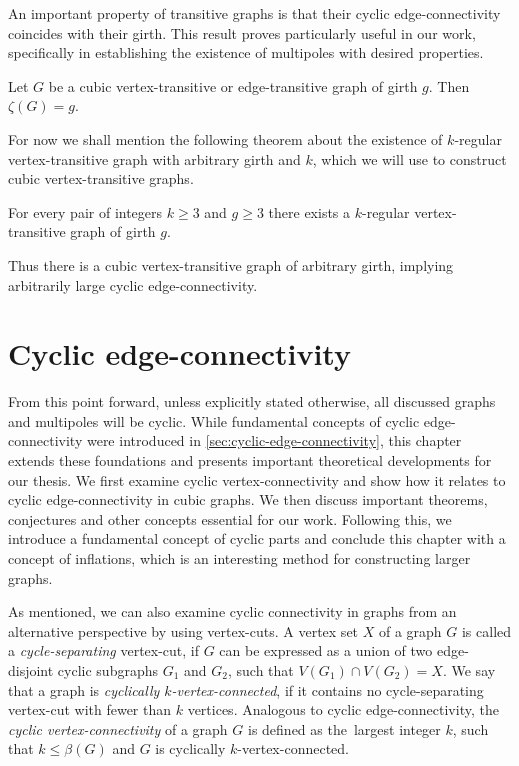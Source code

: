 \documentclass[12pt, twoside]{book}
\begin{document}
An important property of transitive graphs is that their cyclic edge-connectivity coincides with their girth. This result proves particularly useful in our work, specifically in establishing the existence of multipoles with desired properties.

\begin{theorem}\label{th:cyclic-connectivity-of-transitive}
	Let $G$ be a cubic \mbox{vertex-transitive} or \mbox{edge-transitive} graph of girth $g$. Then $\zeta(G) = g$.
\end{theorem}

For now we shall mention the following theorem about the existence of $k$-regular vertex-transitive graph with arbitrary girth and $k$, which we will use to construct cubic vertex-transitive graphs.

\begin{theorem}\label{th:vertex-transitive-girth-regular}
	For every pair of integers $k \geq 3$ and $g \geq 3$ there exists a $k$-regular vertex-transitive graph of girth $g$.
\end{theorem}

Thus there is a cubic vertex-transitive graph of arbitrary girth, implying arbitrarily large cyclic \mbox{edge-connectivity}.

\chapter{Cyclic edge-connectivity}\label{ch:cyclic-edge-connectivity}

From this point forward, unless explicitly stated otherwise, all discussed graphs and multipoles will be cyclic. While fundamental concepts of cyclic edge-connectivity were introduced in \cref{sec:cyclic-edge-connectivity}, this chapter extends these foundations and presents important theoretical developments for our thesis. We first examine cyclic vertex-connectivity and show how it relates to cyclic edge-connectivity in cubic graphs. We then discuss important theorems, conjectures and other concepts essential for our work. Following this, we introduce a fundamental concept of cyclic parts and conclude this chapter with a concept of inflations, which is an interesting method for constructing larger graphs.

As mentioned, we can also examine cyclic connectivity in graphs from an alternative perspective by using vertex-cuts. A vertex set $X$ of a graph $G$ is called a \mbox{\textit{cycle-separating}} vertex-cut, if $G$ can be expressed as a union of two edge-disjoint cyclic subgraphs $G_1$ and $G_2$, such that $V(G_1) \cap V(G_2) = X$. We say that a graph is \textit{cyclically \mbox{$k$-vertex-connected}}, if it contains no cycle-separating vertex-cut with fewer than $k$ vertices. Analogous to cyclic \mbox{edge-connectivity}, the \textit{cyclic \mbox{vertex-connectivity}} of a graph $G$ is defined as the~largest integer $k$, such that $k\leq \beta(G)$ and $G$ is cyclically \mbox{$k$-vertex-connected}.
\end{document}
